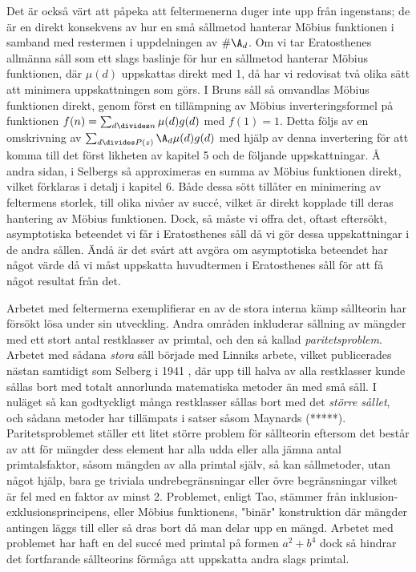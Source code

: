 Det är också värt att påpeka att feltermenerna duger inte upp från ingenstans; de är en direkt konsekvens av hur en små sållmetod hanterar Möbius funktionen i samband med restermen i uppdelningen av \(\#\A_d\).
Om vi tar Eratosthenes allmänna såll som ett slags baslinje för hur en sållmetod hanterar Möbius funktionen, där \(\mu(d)\) uppskattas direkt med 1, då har vi redovisat två olika sätt att minimera uppskattningen som görs. 
I Bruns såll så omvandlas Möbius funktionen direkt, genom först en tillämpning av Möbius inverteringsformel på funktionen \(f(n) = \sum_{d\divides n}\mu(d)g(d)\) med \(f(1) = 1\). 
Detta följs av en omskrivning av \(\sum_{d\divides P(z)}\A_d \mu(d) g(d)\) med hjälp av denna invertering för att komma till det först likheten av kapitel 5 och de följande uppskattningar. 
Å andra sidan, i Selbergs så approximeras en summa av Möbius funktionen direkt, vilket förklaras i detalj i kapitel 6.
Både dessa sött tillåter en minimering av feltermens storlek, till olika nivåer av succé, vilket är direkt kopplade till deras hantering av Möbius funktionen.
Dock, så måste vi offra det, oftast eftersökt, asymptotiska beteendet vi får i Eratosthenes såll då vi gör dessa uppskattningar i de andra sållen.
Ändå är det svårt att avgöra om asymptotiska beteendet har något värde då vi måst uppskatta huvudtermen i Eratosthenes såll för att få något resultat från det.



Arbetet med feltermerna exemplifierar en av de stora interna kämp sållteorin har försökt lösa under sin utveckling.
Andra områden inkluderar sållning av mängder med ett stort antal restklasser av primtal, och den så kallad \textit{paritetsproblem}. Arbetet med sådana \textit{stora} såll började med Linniks arbete, vilket publicerades nästan samtidigt som Selberg i 1941 \cite[s. 135]{cojocarumurty}, där upp till halva av alla restklasser kunde sållas bort med totalt annorlunda matematiska metoder än med små såll. 
I nuläget så kan godtyckligt många restklasser sållas bort med det \textit{större sållet}, och sådana metoder har tillämpats i satser såsom Maynards \cite{mayBound}(*****).
Paritetsproblemet ställer ett litet större problem för sållteorin eftersom det består av att för mängder dess element har alla udda eller alla jämna antal primtalsfaktor, såsom mängden av alla primtal själv, så kan sållmetoder, utan något hjälp, bara ge triviala undrebegränsningar eller övre begränsningar vilket är fel med en faktor av minst 2.
Problemet, enligt Tao, stämmer från inklusion-exklusionsprincipens, eller Möbius funktionens, "binär" konstruktion där mängder antingen läggs till eller så dras bort då man delar upp en mängd.
Arbetet med problemet har haft en del succé med primtal på formen \(a^2 + b^4\) \cite{abPrimes} dock så hindrar det fortfarande sållteorins förmåga att uppskatta andra slags primtal.